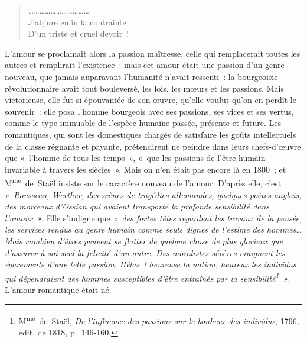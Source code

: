 \documentclass[french,twoside]{book} %
\begin{document}
\begin{verse}
……………………………\\
J’abjure enfin la contrainte\\
D’un triste et cruel devoir !\\
\end{verse}

\noindent L’amour se proclamait alors la passion maîtresse, celle qui remplacerait toutes les autres et remplirait l’existence : mais cet amour était une passion d’un genre nouveau, que jamais auparavant l’humanité n’avait ressenti : la bourgeoisie révolutionnaire avait tout bouleversé, les lois, les mœurs et les passions. Mais victorieuse, elle fut si épouvantée de son œuvre, qu’elle voulut qu’on en perdît le souvenir : elle posa l’homme bourgeois avec ses passions, ses vices et ses vertus, comme le type immuable de l’espèce humaine passée, présente et future. Les romantiques, qui sont les domestiques chargés de satisfaire les goûts intellectuels de la classe régnante et payante, prétendirent ne peindre dans leurs chefs-d’œuvre que « l’homme de tous les temps », « que les passions de l’être humain invariable à travers les siècles ». Mais on n’en était pas encore là en 1800 ; et M\textsuperscript{me} de Staël insiste sur le caractère nouveau de l’amour. D’après elle, c’est \emph{« Rousseau, Werther, des scènes de tragédies allemandes, quelques poètes anglais, des morceaux d’Ossian qui avaient transporté la profonde sensibilité dans  
\label{p604}l’amour »}. Elle s’indigne que \emph{« des fortes têtes regardent les travaux de la pensée, les services rendus au genre humain comme seuls dignes de l’estime des hommes… Mais combien d’êtres peuvent se flatter de quelque chose de plus glorieux que d’assurer à soi seul la félicité d’un autre. Des moralistes sévères craignent les égarements d’une telle passion. Hélas ! heureuse la nation, heureux les individus qui dépendraient des hommes susceptibles d’être entraînés par la sensibilité\footnote{M\textsuperscript{me} de Staël, \emph{De l’influence des passions sur le bonheur des individus}, 1796, édit. de 1818, p. 146-160.} »}. L’amour romantique était né.\par
\end{document}
